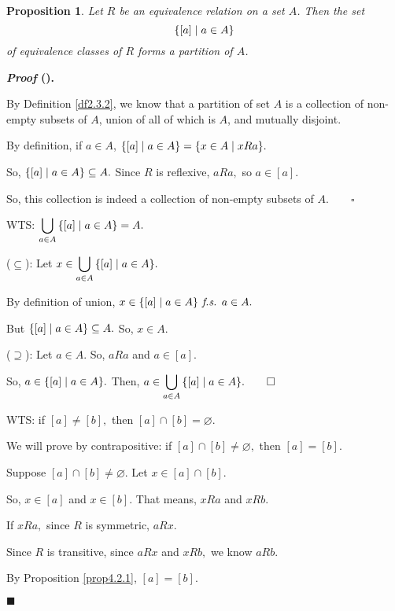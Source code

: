 \documentclass[12pt,a4paper]{article}
\newtheorem{prop}{Proposition}[section]
\newcounter{nprf}[subsection]
\newenvironment*{prf}{\par\indent\textbf{\textit{Proof} (\stepcounter{nprf}\thenprf). }\par }{\par\hfill $\blacksquare$\par}
\def\emptyset{\varnothing}
\def\fs{\emph{ f.s. }}
\begin{document}
\begin{framed}
\begin{prop} Let $R$ be an equivalence relation on a set $A$. Then the set \[\qty{[a]\mid a\in A}\] of equivalence classes of $R$ forms a partition of $A$. \end{prop}
\begin{prf}
	By Definition \ref{df2.3.2}, we know that a partition of set $A$ is a collection of non-empty subsets of $A$, union of all of which is $A$, and mutually disjoint.\par
	By definition, if $a\in A$, $\qty{[a]\mid a\in A}=\qty{x\in A\mid xRa}.$\par So, $\qty{[a]\mid a\in A}\subseteq A.$ Since $R$ is reflexive, $aRa,$ so $a\in[a].$\par So, this collection is indeed a collection of non-empty subsets of $A.\qquad\square$\par WTS: $\displaystyle\bigcup_{a\in A}\qty{[a]\mid a\in A}=A.$\par\hspace{5mm} 
	($\subseteq$): Let $x\in\displaystyle\bigcup_{a\in A}\qty{[a]\mid a\in A}.$\par\hspace{10mm} By definition of union, $x\in\qty{[a]\mid a\in A}\fs a\in A.$\par\hspace{10mm} But $\qty{[a]\mid a\in A}\subseteq A.$ So, $x\in A.$\par\hspace{5mm}
	($\supseteq$): Let $a\in A$. So, $aRa$ and $a\in[a].$\par\hspace{10mm} So, $a\in\qty{[a]\mid a\in A}.$ Then, $a\in\displaystyle\bigcup_{a\in A}\qty{[a]\mid a\in A}.\qquad\square$\par
	WTS: if $[a]\neq[b],$ then $[a]\cap[b]=\emptyset.$\par\hspace{5mm} We will prove by contrapositive: if $[a]\cap[b]\neq\emptyset,$ then $[a]=[b].$\par\hspace{5mm} Suppose $[a]\cap[b]\neq\emptyset.$ Let $x\in[a]\cap[b].$\par\hspace{5mm}  So, $x\in[a]$ and $x\in[b].$ That means, $xRa$ and $xRb.$\par\hspace{5mm} If $xRa,$ since $R$ is symmetric, $aRx$.\par\hspace{5mm} Since $R$ is transitive, since $aRx$ and $xRb,$ we know $aRb.$\par\hspace{5mm} By Proposition \ref{prop4.2.1}, $[a]=[b].$
\end{prf}
\end{framed}
\end{document}
